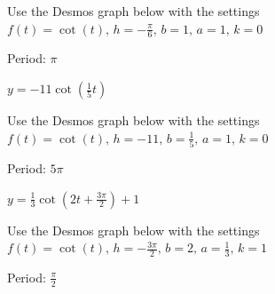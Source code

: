\documentclass{ximera}
\begin{document}
\begin{question}
\begin{problem}
\begin{solution}
Use the Desmos graph below with the settings $f(t)=\cot(t),\,h=-\frac{\pi}{6},\,b=1,\,a=1,\,k=0$

\begin{center} 
\end{center}

Period: $\pi$\\
\end{solution}
\end{problem}

\begin{problem}
    $y = -11\cot \left( \frac{1}{5} t \right)$

\begin{solution}
Use the Desmos graph below with the settings $f(t)=\cot(t),\,h=-11,\,b=\frac{1}{5},\,a=1,\,k=0$

\begin{center} 
\end{center}

Period: $5\pi$\\
\end{solution}
\end{problem}

\begin{problem}\label{othergraphslast}
    $y = \frac{1}{3} \cot \left( 2t + \frac{3\pi}{2} \right) + 1$

\begin{solution}
Use the Desmos graph below with the settings $f(t)=\cot(t),\,h=-\frac{3\pi}{2},\,b=2,\,a=\frac{1}{3},\,k=1$

\begin{center} 
\end{center}

Period: $\frac{\pi}{2}$\\
\end{solution}
\end{problem}

\end{question}
\end{document}
